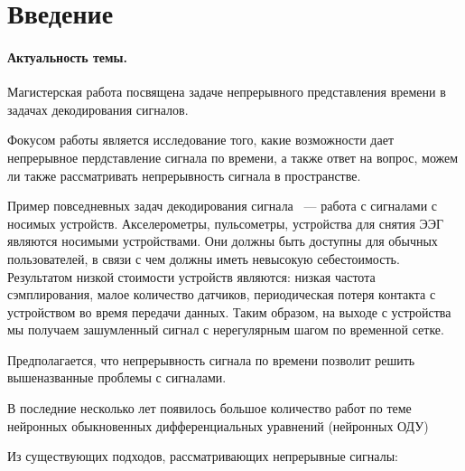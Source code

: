 \documentclass[12pt]{article}
\begin{document}
\newpage

\section*{Введение}




\paragraph{Актуальность темы.}
Магистерская работа посвящена задаче непрерывного представления времени в задачах декодирования сигналов. 

Фокусом работы является исследование того, какие возможности дает непрерывное пердставление сигнала по времени, а также ответ на вопрос, можем ли также рассматривать непрерывность сигнала в пространстве. 

Пример повседневных задач декодирования сигнала ~--- работа с сигналами с носимых устройств. Акселерометры, пульсометры, устройства для снятия ЭЭГ являются носимыми устройствами. Они должны быть доступны для обычных пользователей, в связи с чем должны иметь невысокую себестоимость. Результатом низкой стоимости устройств являются: низкая частота сэмплирования, малое количество датчиков, периодическая потеря контакта с устройством во время передачи данных. Таким образом, на выходе с устройства мы получаем зашумленный сигнал с нерегулярным шагом по временной сетке. 

Предполагается, что непрерывность сигнала по времени позволит решить вышеназванные проблемы с сигналами.

В последние несколько лет появилось большое количество работ по теме нейронных обыкновенных дифференциальных уравнений (нейронных ОДУ) \cite{a lot of papers}

Из существующих подходов, рассматривающих непрерывные сигналы: %
\end{document}
